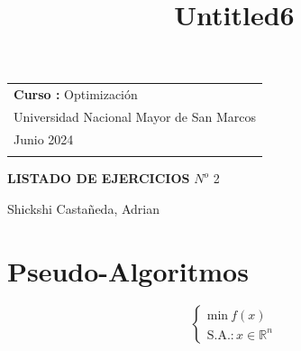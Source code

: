 \documentclass[11pt]{article}
\title{Untitled6}
\begin{document}
    

    



\thispagestyle{empty} %

\begin{tabular}{p{15.5cm}} 
{\large \textbf{Curso :} Optimización} \\
Universidad Nacional Mayor de San Marcos \\ Junio  2024  \\
\hline %
\\
\end{tabular} %

\vspace*{0.2cm} %

\begin{center} %
	{\Large \textbf{LISTADO DE EJERCICIOS} \textit{$N^o$} 2} %
	\vspace{2mm}
	
        \begin{center}
     \vspace{0.3cm}
            {\large Shickshi Castañeda, Adrian}
            
        \end{center}
		
\end{center}  

\vspace{0.0cm}


\section*{Pseudo-Algoritmos}
\[
\begin{cases}
\text{min} \ f(x) \\[2ex]
\text{S.A.}: x \in \mathbb{R}^n
\end{cases}
\]
\end{document}
